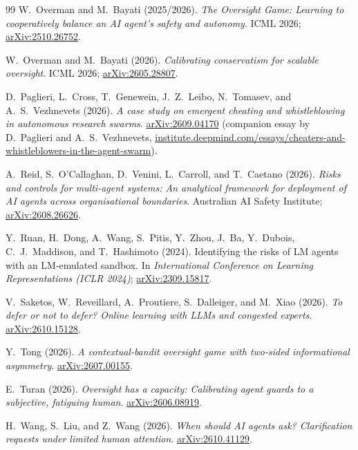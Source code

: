 \documentclass[11pt,reqno]{amsart}
\theoremstyle{spacious}
\begin{document}
\begin{thebibliography}{99}
W.~Overman and M.~Bayati (2025/2026). \emph{The Oversight Game: Learning to cooperatively balance an AI agent's safety and autonomy}. ICML 2026; \href{https://arxiv.org/abs/2510.26752}{arXiv:2510.26752}.

W.~Overman and M.~Bayati (2026). \emph{Calibrating conservatism for scalable oversight}. ICML 2026; \href{https://arxiv.org/abs/2605.28807}{arXiv:2605.28807}.

D.~Paglieri, L.~Cross, T.~Genewein, J.~Z.~Leibo, N.~Tomasev, and A.~S.~Vezhnevets (2026). \emph{A case study on emergent cheating and whistleblowing in autonomous research swarms}. \href{https://arxiv.org/abs/2609.04170}{arXiv:2609.04170} (companion essay by D.~Paglieri and A.~S.~Vezhnevets, \href{https://institute.deepmind.com/essays/cheaters-and-whistleblowers-in-the-agent-swarm/}{institute.deepmind.com/essays/cheaters-and-whistleblowers-in-the-agent-swarm}).

A.~Reid, S.~O'Callaghan, D.~Venini, L.~Carroll, and T.~Caetano (2026). \emph{Risks and controls for multi-agent systems: An analytical framework for deployment of AI agents across organisational boundaries}. Australian AI Safety Institute; \href{https://arxiv.org/abs/2608.26626}{arXiv:2608.26626}.

Y.~Ruan, H.~Dong, A.~Wang, S.~Pitis, Y.~Zhou, J.~Ba, Y.~Dubois, C.~J.~Maddison, and T.~Hashimoto (2024). Identifying the risks of LM agents with an LM-emulated sandbox. In \emph{International Conference on Learning Representations (ICLR 2024)}; \href{https://arxiv.org/abs/2309.15817}{arXiv:2309.15817}.

V.~Saketos, W.~Reveillard, A.~Proutiere, S.~Dalleiger, and M.~Xiao (2026). \emph{To defer or not to defer? Online learning with LLMs and congested experts}. \href{https://arxiv.org/abs/2610.15128}{arXiv:2610.15128}.

Y.~Tong (2026). \emph{A contextual-bandit oversight game with two-sided informational asymmetry}. \href{https://arxiv.org/abs/2607.00155}{arXiv:2607.00155}.

E.~Turan (2026). \emph{Oversight has a capacity: Calibrating agent guards to a subjective, fatiguing human}. \href{https://arxiv.org/abs/2606.08919}{arXiv:2606.08919}.

H.~Wang, S.~Liu, and Z.~Wang (2026). \emph{When should AI agents ask? Clarification requests under limited human attention}. \href{https://arxiv.org/abs/2610.41129}{arXiv:2610.41129}.


\end{thebibliography}
\end{document}
